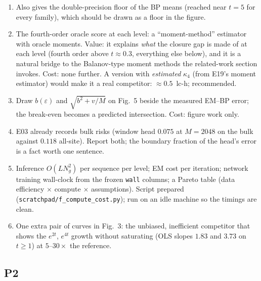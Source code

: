 \begin{enumerate}[label=\textbf{P1.\arabic*}]
\item {} Also gives the double-precision floor of the BP means (reached near $t=5$ for every family), which should be drawn as a floor in the figure.
\item {} The fourth-order oracle score at each level: a ``moment-method'' estimator with oracle moments. Value: it explains \emph{what} the closure gap is made of at each level (fourth order above $t\approx0.3$, everything else below), and it is a natural bridge to the Balanov-type moment methods the related-work section invokes. Cost: none further. A version with \emph{estimated} $\kappa_4$ (from E19's moment estimator) would make it a real competitor: $\approx0.5$~lc-h; recommended.
\item {} Draw $b(\varepsilon)$ and $\sqrt{b^2+v/M}$ on Fig.~5 beside the measured EM--BP error; the break-even becomes a predicted intersection. Cost: figure work only.
\item {} E03 already records bulk risks (window head $0.075$ at $M=2048$ on the bulk against $0.118$ all-site). Report both; the boundary fraction of the head's error is a fact worth one sentence.
\item {} Inference $O(LN_g^2)$ per sequence per level; EM cost per iteration; network training wall-clock from the frozen \texttt{wall} columns; a Pareto table (data efficiency $\times$ compute $\times$ assumptions). Script prepared (\texttt{scratchpad/f\_compute\_cost.py}); run on an idle machine so the timings are clean.
\item {} One extra pair of curves in Fig.~3: the unbiased, inefficient competitor that shows the $e^{2t}$, $e^{4t}$ growth without saturating (OLS slopes $1.83$ and $3.73$ on $t\ge1$) at $5$--$30\times$ the reference.
\end{enumerate}

\subsection*{P2}

